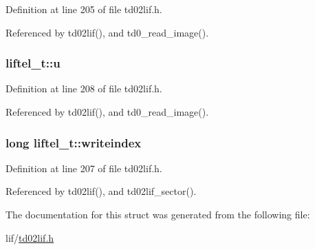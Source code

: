 Definition at line 205 of file td02lif.\+h.



Referenced by td02lif(), and td0\+\_\+read\+\_\+image().

\subsubsection[{\texorpdfstring{u}{u}}]{ liftel\+\_\+t\+::u}\hypertarget{structliftel__t_a3a8a41c9a51c6450ac562d525103902a}{}\label{structliftel__t_a3a8a41c9a51c6450ac562d525103902a}


Definition at line 208 of file td02lif.\+h.



Referenced by td02lif(), and td0\+\_\+read\+\_\+image().

\subsubsection[{\texorpdfstring{writeindex}{writeindex}}]{\setlength{\rightskip}{0pt plus 5cm}long liftel\+\_\+t\+::writeindex}\hypertarget{structliftel__t_a3c5f11408ea86ded8a0bc0d20a0ea689}{}\label{structliftel__t_a3c5f11408ea86ded8a0bc0d20a0ea689}


Definition at line 207 of file td02lif.\+h.



Referenced by td02lif(), and td02lif\+\_\+sector().



The documentation for this struct was generated from the following file\+:\begin{DoxyCompactItemize}
\item 
lif/\hyperlink{td02lif_8h}{td02lif.\+h}\end{DoxyCompactItemize}
